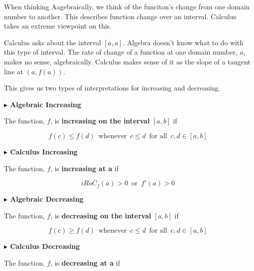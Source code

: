 \documentclass{ximera}
\begin{document}
When thinking Aagebraically, we think of the funciton's change from one domain number to another. This describes function change over an interval. Calculus takes an extreme viewpoint on this.  

Calculus asks about the interval $[a,a]$. Algebra doesn't know what to do with this type of interval. The rate of change of a function at one domain number, $a$, makes no sense, algebraically. Calculus makes sense of it as the slope of a tangent line at $(a, f(a))$. 

This gives us two types of interpretations for increasing and decreasing. 


\textbf{\textcolor{red!70!black}{$\blacktriangleright$ Algebraic Increasing}} 



The function, $f$, is \textbf{\textcolor{purple!70!blue}{increasing on the interval}} $[a, b]$ if


\[
f(c) \leq f(d) \, \text{ whenever } \, c \leq d \, \text{ for all } \, c, d \in [a,b]
\]









\textbf{\textcolor{red!70!black}{$\blacktriangleright$ Calculus Increasing}} 



The function, $f$, is \textbf{\textcolor{purple!70!blue}{increasing at a}} if


\[
iRoC_f(a) > 0 \, \text{ or } \, f'(a) > 0
\]










\textbf{\textcolor{red!70!black}{$\blacktriangleright$ Algebraic Decreasing}} 



The function, $f$, is \textbf{\textcolor{purple!85!blue}{decreasing on the interval}} $[a, b]$ if


\[
f(c) \geq f(d) \, \text{ whenever } \, c \leq d \, \text{ for all } \, c, d \in [a,b]
\]









\textbf{\textcolor{red!80!black}{$\blacktriangleright$ Calculus Decreasing}} 



The function, $f$, is \textbf{\textcolor{purple!85!blue}{decreasing at a}} if
\end{document}
